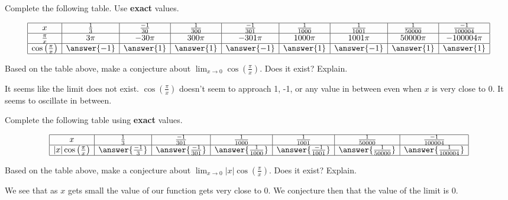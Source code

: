 \documentclass{ximera}
\author{Nela Lakos \and Kyle Parsons}
\begin{document}
\begin{exercise}

Complete the following table.  Use \textbf{exact} values.

\[
\begin{array}{|c|c|c|c|c|c|c|c|c|}
\hline
x & \frac{1}{3} & \frac{-1}{30} & \frac{1}{300} & \frac{-1}{301} & \frac{1}{1000} & \frac{1}{1001} & \frac{1}{50000} & \frac{-1}{100004}\\\hline
\frac{\pi}{x} & 3\pi & -30\pi & 300\pi & -301\pi & 1000\pi & 1001\pi & 50000\pi & -100004\pi \\\hline
\cos\left(\frac{\pi}{x}\right) & \answer{-1} & \answer{1} & \answer{1} & \answer{-1} & \answer{1} & \answer{-1} & \answer{1} & \answer{1} \\\hline
\end{array}
\]

\begin{question}
Based on the table above, make a conjecture about $\lim_{x\to0}\cos\left(\frac{\pi}{x}\right)$.  Does it exist? Explain.
\begin{freeResponse}
It seems like the limit does not exist.  $\cos\left(\frac{\pi}{x}\right)$ doesn't seem to approach 1, -1, or any value in between even when $x$ is very close to 0.  It seems to oscillate in between.
\end{freeResponse}
\end{question}

\begin{exercise}

Complete the following table using \textbf{exact} values.

\[
\begin{array}{|c|c|c|c|c|c|c|}
\hline
x & \frac{1}{3} & \frac{-1}{301} & \frac{1}{1000} & \frac{1}{1001} & \frac{1}{50000} & \frac{-1}{100004}\\\hline
\left|x\right|\cos\left(\frac{\pi}{x}\right) & \answer{\frac{-1}{3}} & \answer{\frac{-1}{301}} & \answer{\frac{1}{1000}} & \answer{\frac{-1}{1001}} & \answer{\frac{1}{50000}} & \answer{\frac{1}{100004}}\\\hline
\end{array}
\]

\begin{question}
Based on the table above, make a conjecture about $\lim_{x\to0}\left|x\right|\cos\left(\frac{\pi}{x}\right)$.  Does it exist?  Explain.
\begin{freeResponse}
We see that as $x$ gets small the value of our function gets very close to 0.  We conjecture then that the value of the limit is 0.
\end{freeResponse}
\end{question}


\end{exercise}
\end{exercise}
\end{document}
